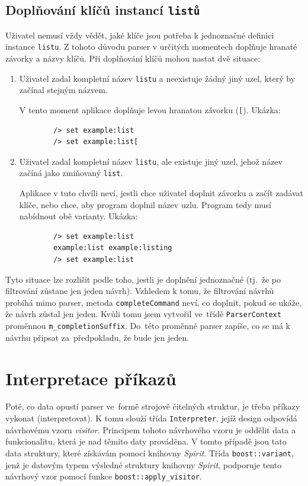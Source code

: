 \documentclass[thesis=B,czech,hidelinks]{FITthesis}[2019/03/06]
\begin{document}
\subsection{Doplňování klíčů instancí \texttt{listů}}
Uživatel nemusí vždy vědět, jaké klíče jsou potřeba k jednoznačné definici instance \texttt{listu}. Z tohoto důvodu parser v určitých momentech doplňuje hranaté závorky a názvy klíčů. Při doplňování klíčů mohou nastat dvě situace:

\begin{enumerate}
    \item Uživatel zadal kompletní název \texttt{listu} a neexistuje žádný jiný uzel, který by začínal stejným názvem.

        V tento moment aplikace doplňuje levou hranatou závorku (\verb¨[¨). Ukázka:
        \begin{verbatim}
        /> set example:list
        /> set example:list[
        \end{verbatim}

    \item Uživatel zadal kompletní název \texttt{listu}, ale existuje jiný uzel, jehož název začíná jako zmiňovaný \texttt{list}.

        Aplikace v tuto chvíli neví, jestli chce uživatel doplnit závorku a začít zadávat klíče, nebo chce, aby program doplnil název uzlu. Program tedy musí nabídnout obě varianty. Ukázka:
        \begin{verbatim}
        /> set example:list
        example:list example:listing
        /> set example:list
        \end{verbatim}

\end{enumerate}
Tyto situace lze rozlišit podle toho, jestli je doplnění jednoznačné (tj.\ že po filtrování zůstane jen jeden návrh). Vzhledem k tomu, že filtrování návrhů probíhá mimo parser, metoda \texttt{completeCommand} neví, co doplnit, pokud se ukáže, že návrh zůstal jen jeden. Kvůli tomu jsem vytvořil ve~třídě \texttt{ParserContext} proměnnou \texttt{m\_completionSuffix}. Do~této proměnné parser zapíše, co se má k návrhu připsat za~předpokladu, že bude jen jeden.


\section{Interpretace příkazů}\label{interpreter}
Poté, co data opustí parser ve~formě strojově čitelných struktur, je třeba příkazy vykonat (interpretovat). K tomu slouží třída \texttt{Interpreter}, jejíž design odpovídá návrhovému vzoru \textit{visitor}. Principem tohoto návrhového vzoru je oddělit data a funkcionalitu, která je nad těmito daty prováděna. V tomto případě jsou tato data struktury, které získávám pomocí knihovny \textit{Spirit}. Třída \texttt{boost::variant}, jenž je datovým typem výsledné struktury knihovny \textit{Spirit}, podporuje tento návrhový vzor pomocí funkce \texttt{boost::apply\_visitor}.
\end{document}
